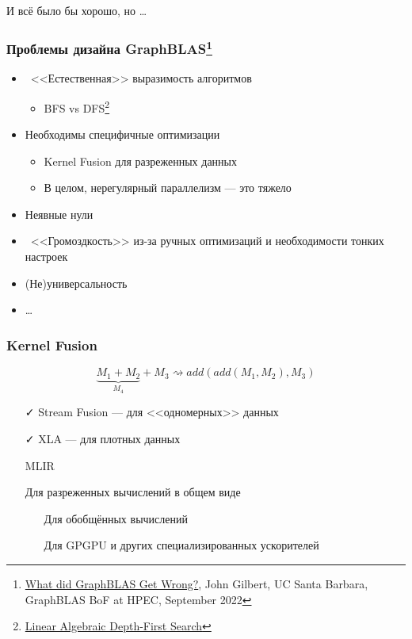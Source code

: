 \documentclass[xcolor=table,aspectratio=169]{beamer}
\begin{document}
\begin{frame}[fragile]
  \begin{center}
  \huge
  И всё было бы хорошо, но \ldots
  \end{center}
\end{frame}

\begin{frame}[fragile]
  \frametitle{Проблемы дизайна GraphBLAS\footnote{\href{https://docs.google.com/document/d/1fMmm-Bmew0wpgJRrjyMHy6G-zPq6R6kQlRum560_4S0/edit?tab=t.0}{What did GraphBLAS Get Wrong?}, John Gilbert, UC Santa Barbara, GraphBLAS BoF at HPEC, September 2022}}
  \begin{itemize}
    \item \ <<Естественная>> выразимость алгоритмов
    \begin{itemize}
      \item BFS vs DFS\footnote{\href{https://dl.acm.org/doi/10.1145/3315454.3329962}{Linear Algebraic Depth-First Search}}
    \end{itemize}
    \item Необходимы специфичные оптимизации
    \begin{itemize}
      \item Kernel Fusion для разреженных данных
      \item В целом, нерегулярный параллелизм --- это тяжело
    \end{itemize}  
    \item Неявные нули
    \item \ <<Громоздкость>> из-за ручных оптимизаций и необходимости тонких настроек    
    \item (Не)универсальность
    \item \ldots
  \end{itemize}
\end{frame}

\begin{frame}[fragile]
  \frametitle{Kernel Fusion}
  \begin{center}
    \[
    \underbrace{M_1 + M_2}_{M_4} + M_3 	\rightsquigarrow add(add(M_1,M_2), M_3)
    \]
  \end{center}
  \begin{itemize}
    \item[\faCheck] Stream Fusion --- для <<одномерных>> данных
    \item[\faCheck] XLA --- для плотных данных
    \item[\faGears] MLIR
    \item[\faQuestion] Для разреженных вычислений в общем виде
    \begin{itemize}
      \item[\faFrownO] Для обобщённых вычислений
      \item[\faFrownO] Для GPGPU и других специализированных ускорителей
    \end{itemize}  
  \end{itemize}
\end{frame}
\end{document}
